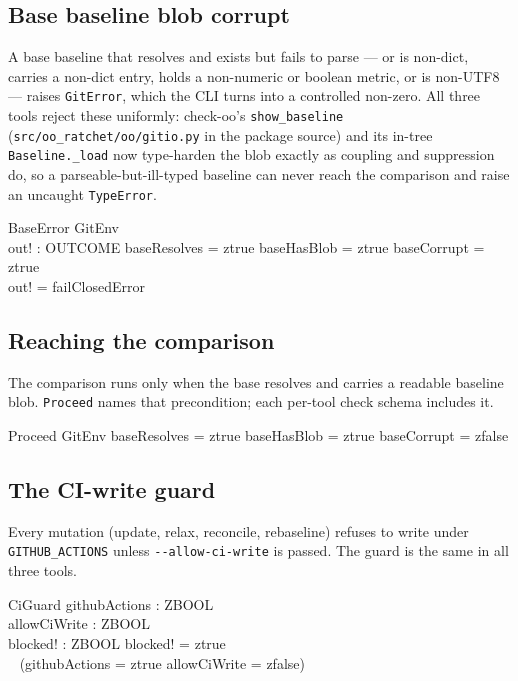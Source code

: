 \documentclass[a4paper,10pt,fleqn]{article}
\begin{document}
\subsection{Base baseline blob corrupt}

A base baseline that resolves and exists but fails to parse --- or is
non-dict, carries a non-dict entry, holds a non-numeric or boolean metric,
or is non-UTF8 --- raises \texttt{GitError}, which the CLI turns into a
controlled non-zero. All three tools reject these uniformly: check-oo's
\texttt{show\_baseline} (\texttt{src/oo\_ratchet/oo/gitio.py} in the package source) and its in-tree
\texttt{Baseline.\_load} now type-harden the blob exactly as coupling and
suppression do, so a parseable-but-ill-typed baseline can never reach the
comparison and raise an uncaught \texttt{TypeError}.

\begin{schema}{BaseError}
GitEnv \\
out! : OUTCOME
\where
baseResolves = ztrue \land baseHasBlob = ztrue \land baseCorrupt = ztrue \\
out! = failClosedError
\end{schema}

\subsection{Reaching the comparison}

The comparison runs only when the base resolves and carries a readable
baseline blob. \texttt{Proceed} names that precondition; each per-tool
check schema includes it.

\begin{schema}{Proceed}
GitEnv
\where
baseResolves = ztrue \land baseHasBlob = ztrue \land baseCorrupt = zfalse
\end{schema}

\subsection{The CI-write guard}

Every mutation (update, relax, reconcile, rebaseline) refuses to write
under \texttt{GITHUB\_ACTIONS} unless \texttt{-{}-allow-ci-write} is
passed. The guard is the same in all three tools.

\begin{schema}{CiGuard}
githubActions : ZBOOL \\
allowCiWrite : ZBOOL \\
blocked! : ZBOOL
\where
blocked! = ztrue \iff \\
\quad~ (githubActions = ztrue \land allowCiWrite = zfalse)
\end{schema}
\end{document}
